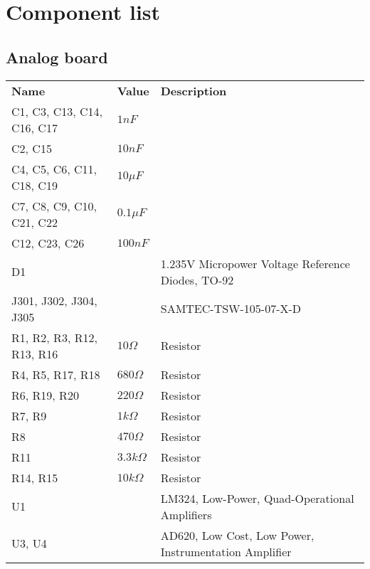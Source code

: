 \section{Component list}
\label{app:component_list}

\subsection{Analog board}
\begin{table}[H]
\centering
\small
\begin{tabular}{p{4cm} p{1.5cm} p{8cm}}
\textbf{Name}              & \textbf{Value} & \textbf{Description}                                  \\
C1, C3, C13, C14, C16, C17 & $1nF$          &                                                       \\
C2, C15                    & $10nF$         &                                                       \\
C4, C5, C6, C11, C18, C19  & $10\mu F$      &                                                       \\
C7, C8, C9, C10, C21, C22  & $0.1\mu F$     &                                                       \\
C12, C23, C26              & $100nF$        &                                                       \\
D1                         &                & 1.235V Micropower Voltage Reference Diodes, TO-92     \\
J301, J302, J304, J305     &                & SAMTEC-TSW-105-07-X-D                                 \\
R1, R2, R3, R12, R13, R16  & $10 \Omega$    & Resistor                                              \\
R4, R5, R17, R18           & $680 \Omega$   & Resistor                                              \\
R6, R19, R20               & $220 \Omega$   & Resistor                                              \\
R7, R9                     & $1k \Omega$    & Resistor                                              \\
R8                         & $470 \Omega$   & Resistor                                              \\
R11                        & $3.3k \Omega$  & Resistor                                              \\
R14, R15                   & $10k \Omega$   & Resistor                                              \\
U1                         &                & LM324, Low-Power, Quad-Operational Amplifiers         \\
U3, U4                     &                & AD620, Low Cost, Low Power, Instrumentation Amplifier
\end{tabular}
\end{table}


